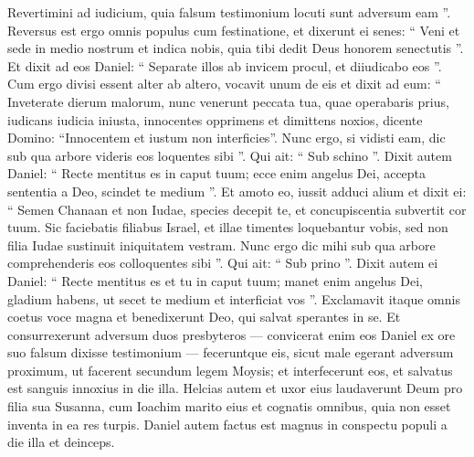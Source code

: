 \begin{biblechapter}
\begin{biblechapter}
\begin{biblechapter}
\begin{biblechapter}
\begin{biblechapter}
\begin{biblechapter}
\begin{biblechapter}
\begin{biblechapter}
\begin{biblechapter}
\begin{biblechapter}
\begin{biblechapter}
\begin{biblechapter}
\begin{biblechapter}
 \verse Revertimini ad iudicium, quia falsum testimonium locuti sunt adversum eam ”. 
 \verse Reversus est ergo omnis populus cum festinatione, et dixerunt ei senes: “ Veni et sede in medio nostrum et indica nobis, quia tibi dedit Deus honorem senectutis ”. 
\verse Et dixit ad eos Daniel: “ Separate illos ab invicem procul, et diiudicabo eos ”. 
\verse Cum ergo divisi essent alter ab altero, vocavit unum de eis et dixit ad eum: “ Inveterate dierum malorum, nunc venerunt peccata tua, quae operabaris prius, 
\verse iudicans iudicia iniusta, innocentes opprimens et dimittens noxios, dicente Domino: “Innocentem et iustum non interficies”. 
\verse Nunc ergo, si vidisti eam, dic sub qua arbore videris eos loquentes sibi ”. Qui ait: “ Sub schino ”. 
\verse Dixit autem Daniel: “ Recte mentitus es in caput tuum; ecce enim angelus Dei, accepta sententia a Deo, scindet te medium ”. 
 \verse Et amoto eo, iussit adduci alium et dixit ei: “ Semen Chanaan et non Iudae, species decepit te, et concupiscentia subvertit cor tuum. 
\verse Sic faciebatis filiabus Israel, et illae timentes loquebantur vobis, sed non filia Iudae sustinuit iniquitatem vestram. 
\verse Nunc ergo dic mihi sub qua arbore comprehenderis eos colloquentes sibi ”.
 Qui ait: “ Sub prino ”. 
\verse Dixit autem ei Daniel: “ Recte mentitus es et tu in caput tuum; manet enim angelus Dei, gladium habens, ut secet te medium et interficiat vos ”. 
\verse Exclamavit itaque omnis coetus voce magna et benedixerunt Deo, qui salvat sperantes in se. 
\verse Et consurrexerunt adversum duos presbyteros — convicerat enim eos Daniel ex ore suo falsum dixisse testimonium — feceruntque eis, sicut male egerant adversum proximum, 
\verse ut facerent secundum legem Moysis; et interfecerunt eos, et salvatus est sanguis innoxius in die illa. 
\verse Helcias autem et uxor eius laudaverunt Deum pro filia sua Susanna, cum Ioachim marito eius et cognatis omnibus, quia non esset inventa in ea res turpis. 
\verse Daniel autem factus est magnus in conspectu populi a die illa et deinceps.
 

\end{biblechapter}
\end{biblechapter}
\end{biblechapter}
\end{biblechapter}
\end{biblechapter}
\end{biblechapter}
\end{biblechapter}
\end{biblechapter}
\end{biblechapter}
\end{biblechapter}
\end{biblechapter}
\end{biblechapter}
\end{biblechapter}
